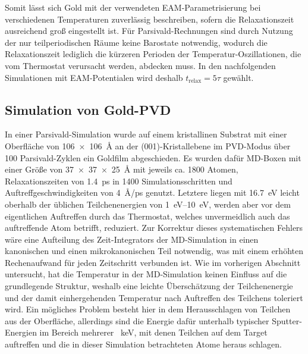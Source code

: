Somit lässt sich Gold mit der verwendeten EAM-Parametrisierung bei verschiedenen Temperaturen zuverlässig beschreiben, sofern die Relaxationszeit ausreichend groß eingestellt ist.
Für Parsivald-Rechnungen sind durch Nutzung der nur teilperiodischen Räume keine Barostate notwendig, wodurch die Relaxationszeit lediglich die kürzeren Perioden der Temperatur-Oszillationen, die vom Thermostat verursacht werden, abdecken muss.
In den nachfolgenden Simulationen mit EAM-Potentialen wird deshalb $t_\text{relax} = 5 \tau$ gewählt.

\subsection{Simulation von Gold-PVD}

In einer Parsivald-Simulation wurde auf einem kristallinen Substrat mit einer Oberfläche von \SI{106x106}{\angstrom} an der (001)-Kristallebene im PVD-Modus über 100 Parsivald-Zyklen ein Goldfilm abgeschieden.
Es wurden dafür MD-Boxen mit einer Größe von \SI{37x37x25}{\angstrom} mit jeweils ca. \num{1800} Atomen, Relaxationszeiten von \SI{1.4}{\pico\second} in \num{1400} Simulationsschritten und Auftreffgeschwindigkeiten von \SI{4}{\angstrom/\pico\second} genutzt.
Letztere liegen mit \SI{16.7}{\electronvolt} leicht oberhalb der üblichen Teilchenenergien von \SIrange{1}{10}{\electronvolt}\cite{thompson_ii._1968}, werden aber vor dem eigentlichen Auftreffen durch das Thermostat, welches unvermeidlich auch das auftreffende Atom betrifft, reduziert.
Zur Korrektur dieses systematischen Fehlers wäre eine Aufteilung des Zeit-Integrators der MD-Simulation in einen kanonischen und einen mikrokanonischen Teil notwendig, was mit einem erhöhten Rechenaufwand für jeden Zeitschritt verbunden ist.
Wie im vorherigen Abschnitt untersucht, hat die Temperatur in der MD-Simulation keinen Einfluss auf die grundlegende Struktur, weshalb eine leichte Überschätzung der Teilchenenergie und der damit einhergehenden Temperatur nach Auftreffen des Teilchens toleriert wird.
Ein mögliches Problem besteht hier in dem Herausschlagen von Teilchen aus der Oberfläche, allerdings sind die Energie dafür unterhalb typischer Sputter-Energien im Bereich mehrerer \SI{}{\kilo\electronvolt}\cite{mattox_handbook_2010}, mit denen Teilchen auf dem Target auftreffen und die in dieser Simulation betrachteten Atome heraus schlagen.

